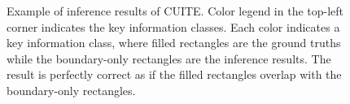 \documentclass[10pt,twocolumn,letterpaper]{article}
\begin{document}
\begin{figure}
\begin{center}
\end{center}
   \caption{Example of inference results of CUITE. Color legend in the top-left corner indicates the key information classes. Each color indicates a key information class, where filled rectangles are the ground truths while the boundary-only rectangles are the inference results. The result is perfectly correct as if the filled rectangles overlap with the boundary-only rectangles.}
\label{fig:result}
\end{figure}
\end{document}
